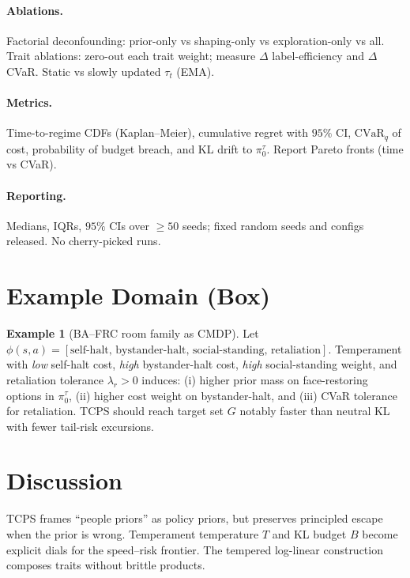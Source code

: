 \documentclass[10pt]{article}
\theoremstyle{plain}
\theoremstyle{definition}
\newtheorem{example}{Example}
\theoremstyle{remark}
\newcommand{\1}{\mathds{1}}
\newcommand{\cvar}{\mathrm{CVaR}}
\begin{document}
\paragraph{Ablations.}
Factorial deconfounding: prior-only vs shaping-only vs exploration-only vs all. Trait ablations: zero-out each trait weight; measure $\Delta$ label-efficiency and $\Delta$ CVaR. Static vs slowly updated $\tau_t$ (EMA).

\paragraph{Metrics.}
Time-to-regime CDFs (Kaplan--Meier), cumulative regret with $95\%$ CI, $\cvar_q$ of cost, probability of budget breach, and KL drift to $\pi_0^\tau$. Report Pareto fronts (time vs CVaR).

\paragraph{Reporting.}
Medians, IQRs, $95\%$ CIs over $\ge 50$ seeds; fixed random seeds and configs released. No cherry-picked runs.

\section{Example Domain (Box)}
\label{sec:example}
\begin{example}[BA--FRC room family as CMDP]
Let $\phi(s,a) = [\text{self-halt},\, \text{bystander-halt},\, \text{social-standing},\, \text{retaliation}]$.
Temperament with \emph{low} self-halt cost, \emph{high} bystander-halt cost, \emph{high} social-standing weight, and retaliation tolerance $\lambda_r>0$ induces:
(i) higher prior mass on face-restoring options in $\pi_0^\tau$,
(ii) higher cost weight on bystander-halt, and
(iii) CVaR tolerance for retaliation. TCPS should reach target set $G$ notably faster than neutral KL with fewer tail-risk excursions.
\end{example}

\section{Discussion}
TCPS frames ``people priors'' as policy priors, but preserves principled escape when the prior is wrong. Temperament temperature $T$ and KL budget $B$ become explicit dials for the speed--risk frontier. The tempered log-linear construction composes traits without brittle products.
\end{document}
